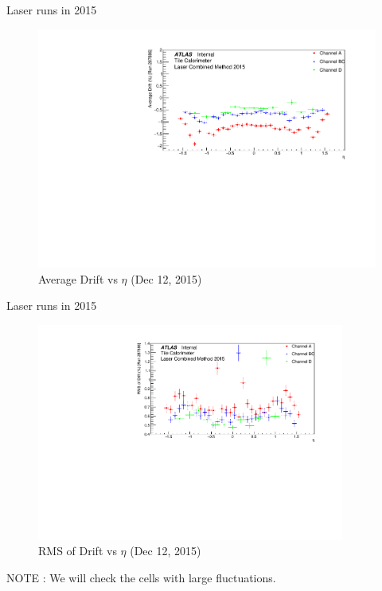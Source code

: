 \documentclass{beamer}
\begin{document}
\begin{frame}{Laser runs in 2015}{}
\begin{figure}
\centering
\includegraphics[width=\textwidth]{drm3.pdf}
\caption{Average Drift vs $\eta$ (Dec 12, 2015)}
\end{figure}
\end{frame}

\begin{frame}{Laser runs in 2015}{}
\begin{figure}
\centering
\includegraphics[width=0.9\textwidth]{drr3.pdf}
\caption{RMS of Drift vs $\eta$ (Dec 12, 2015)}
\end{figure}
NOTE : We will check the cells with large fluctuations.
\end{frame}
\end{document}
